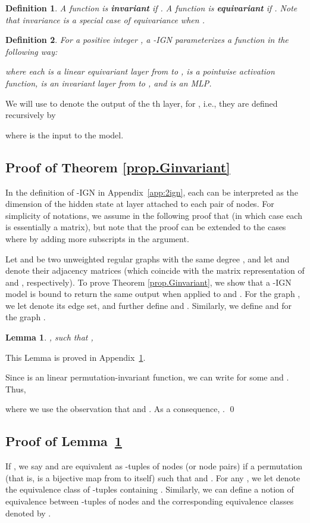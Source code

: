 \documentclass{article}
\newtheorem{lemma}{Lemma}
\newtheorem{definition}{Definition}
\begin{document}
\begin{definition}
A function  is \textbf{invariant} if . A function  is \textbf{equivariant} if . Note that invariance is a special case of equivariance when .
\end{definition}

\begin{definition}
For a positive integer , a -IGN parameterizes a function  in the following way:

where each  is a linear equivariant layer from  to ,  is a pointwise activation function,  is an invariant layer from  to , and  is an MLP.
\end{definition}

We will use  to denote the output of the th layer, for , i.e., they are defined recursively by

where  is the input to the model.

\subsection{Proof of Theorem \ref{prop.Ginvariant}}

In the definition of -IGN in Appendix~\ref{app:2ign}, each  can be interpreted as the dimension of the hidden state at layer  attached to each pair of nodes. For simplicity of notations,  we assume in the following proof that  (in which case each  is essentially a matrix), but note that
the proof can be extended to the cases where  by adding more subscripts in the argument.

Let  and  be two unweighted regular graphs with the same degree , and let  and  denote their adjacency matrices (which coincide with the matrix representation of  and , respectively).
To prove Theorem \ref{prop.Ginvariant}, we show that a -IGN model is bound to return the same output when applied to  and . For the graph , we let  denote its edge set, and further define  and . Similarly, we define  and  for the graph .

\begin{lemma}
\label{lem.A_ind}
,  such that ,

\end{lemma}
This Lemma is proved in Appendix~\ref{lem.A_ind}.

Since  is an linear permutation-invariant function, we can write  for some  and . Thus, 

where we use the observation that  and . As a consequence, .  \qed

\subsection{Proof of Lemma~\ref{lem.A_ind}}
\label{app:pf_lem_A_ind}
If , we say  and  are equivalent as -tuples of nodes (or node pairs) if  a permutation  (that is,  is a bijective map from  to itself) such that  and . For any , we let  denote the equivalence class of -tuples containing . Similarly, we can define a notion of equivalence between -tuples of nodes and the corresponding equivalence classes denoted by .
\end{document}
